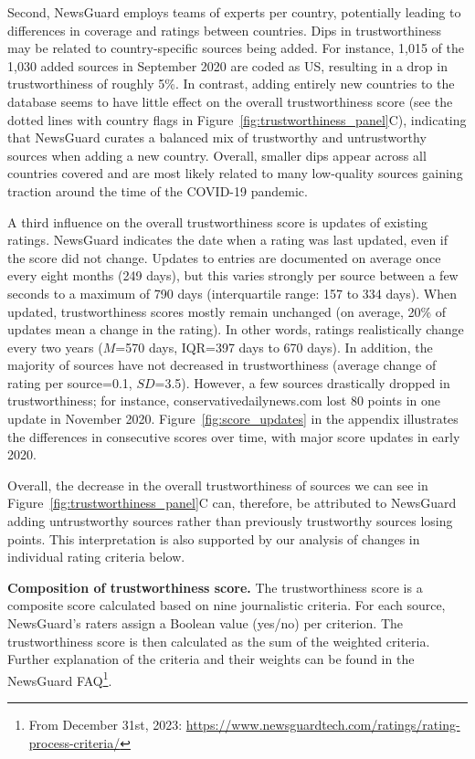 \documentclass[12pt,twoside]{article}
\begin{document}
Second, NewsGuard employs teams of experts per country, potentially leading to differences in coverage and ratings between countries. 
Dips in trustworthiness may be related to country-specific sources being added. 
For instance, 1,015 of the 1,030 added sources in September 2020 are coded as US, resulting in a drop in trustworthiness of roughly 5\%. 
In contrast, adding entirely new countries to the database seems to have little effect on the overall trustworthiness score (see the dotted lines with country flags in Figure~\ref{fig:trustworthiness_panel}C), indicating that NewsGuard curates a balanced mix of trustworthy and untrustworthy sources when adding a new country. 
Overall, smaller dips appear across all countries covered and are most likely related to many low-quality sources gaining traction around the time of the COVID-19 pandemic. 

A third influence on the overall trustworthiness score is updates of existing ratings. 
NewsGuard indicates the date when a rating was last updated, even if the score did not change. 
Updates to entries are documented on average once every eight months (249 days), but this varies strongly per source between a few seconds to a maximum of 790 days (interquartile range: 157 to 334 days). 
When updated, trustworthiness scores mostly remain unchanged (on average, 20\% of updates mean a change in the rating). 
In other words, ratings realistically change every two years ($M$=570 days, IQR=397 days to 670 days). 
In addition, the majority of sources have not decreased in trustworthiness (average change of rating per source=0.1, $SD$=3.5). 
However, a few sources drastically dropped in trustworthiness; for instance, conservativedailynews.com lost 80 points in one update in November 2020. 
Figure~\ref{fig:score_updates} in the appendix illustrates the differences in consecutive scores over time, with major score updates in early 2020. 

Overall, the decrease in the overall trustworthiness of sources we can see in Figure~\ref{fig:trustworthiness_panel}C can, therefore, be attributed to NewsGuard adding untrustworthy sources rather than previously trustworthy sources losing points. 
This interpretation is also supported by our analysis of changes in individual rating criteria below.


\textbf{Composition of trustworthiness score.} 
The trustworthiness score is a composite score calculated based on nine journalistic criteria. 
For each source, NewsGuard's raters assign a Boolean value (yes/no) per criterion. 
The trustworthiness score is then calculated as the sum of the weighted criteria. 
Further explanation of the criteria and their weights can be found in the NewsGuard FAQ\footnote{From December 31st, 2023: \href{https://web.archive.org/web/20231230155214/https://www.newsguardtech.com/ratings/rating-process-criteria/}{https://www.newsguardtech.com/ratings/rating-process-criteria/}}.
\end{document}
